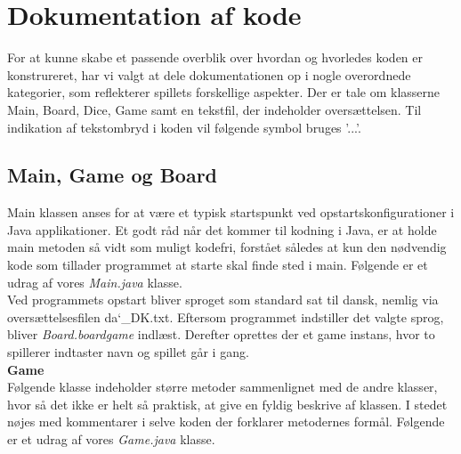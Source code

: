 \section{Dokumentation af kode}

\noindent For at kunne skabe et passende overblik over hvordan og hvorledes koden er konstrureret, har vi valgt at dele dokumentationen op i nogle overordnede kategorier, som reflekterer spillets forskellige aspekter. Der er tale om klasserne Main, Board, Dice, Game samt en tekstfil, der indeholder oversættelsen.
Til indikation af tekstombryd i koden vil følgende symbol bruges '...'.\\

\subsection{Main, Game og Board}
\noindent Main klassen anses for at være et typisk startspunkt ved opstartskonfigurationer i Java applikationer. 
Et godt råd når det kommer til kodning i Java, er at holde main metoden så vidt som muligt kodefri, forstået således at kun den nødvendig kode som tillader programmet at starte skal finde sted i main. 
Følgende er et udrag af vores \textit{Main.java} klasse.\\

\noindent Ved programmets opstart bliver sproget som standard sat til dansk, nemlig via oversættelsesfilen da\char`_DK.txt. 
Eftersom programmet indstiller det valgte sprog, bliver \textit{Board.boardgame} indlæst. 
Derefter oprettes der et game instans, hvor to spillerer indtaster navn og spillet går i gang.\\

\textbf{\large Game} \\
\noindent Følgende klasse indeholder større metoder sammenlignet med de andre klasser, hvor så det ikke er helt så praktisk, at give en fyldig beskrive af klassen.
I stedet nøjes med kommentarer i selve koden der forklarer metodernes formål.
Følgende er et udrag af vores \textit{Game.java} klasse.\\


